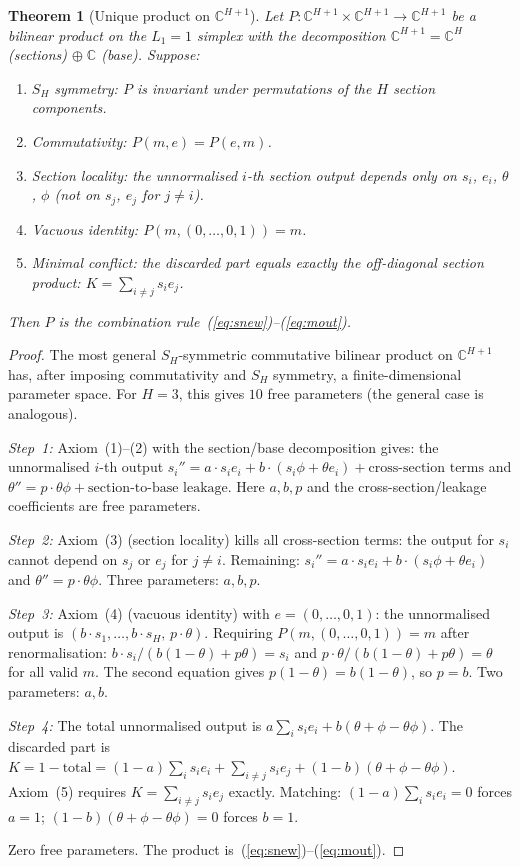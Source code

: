 \documentclass[11pt,a4paper]{article}
\newtheorem{theorem}{Theorem}[section]
\theoremstyle{definition}
\theoremstyle{remark}
\newcommand{\C}{\mathbb{C}}
\begin{document}
\begin{theorem}[Unique product on $\C^{H+1}$]\label{thm:unique_product}
Let $P:\C^{H+1}\times\C^{H+1}\to\C^{H+1}$ be a bilinear product on the $L_1=1$ simplex with the decomposition $\C^{H+1}=\C^H$ (sections) $\oplus\;\C$ (base). Suppose:
\begin{enumerate}[nosep]
\item \emph{$S_H$ symmetry:} $P$ is invariant under permutations of the $H$ section components.
\item \emph{Commutativity:} $P(m,e)=P(e,m)$.
\item \emph{Section locality:} the unnormalised $i$-th section output depends only on $s_i$, $e_i$, $\theta$, $\phi$ (not on $s_j$, $e_j$ for $j\neq i$).
\item \emph{Vacuous identity:} $P(m,(0,\ldots,0,1))=m$.
\item \emph{Minimal conflict:} the discarded part equals exactly the off-diagonal section product: $K=\sum_{i\neq j}s_ie_j$.
\end{enumerate}
Then $P$ is the combination rule~(\ref{eq:snew})--(\ref{eq:mout}).
\end{theorem}

\begin{proof}
The most general $S_H$-symmetric commutative bilinear product on $\C^{H+1}$ has, after imposing commutativity and $S_H$ symmetry, a finite-dimensional parameter space. For $H=3$, this gives $10$ free parameters (the general case is analogous).

\emph{Step~1:} Axiom~(1)--(2) with the section/base decomposition gives: the unnormalised $i$-th output $s_i''=a\cdot s_ie_i+b\cdot(s_i\phi+\theta e_i)+\text{cross-section terms}$ and $\theta''=p\cdot\theta\phi+\text{section-to-base leakage}$. Here $a,b,p$ and the cross-section/leakage coefficients are free parameters.

\emph{Step~2:} Axiom~(3) (section locality) kills all cross-section terms: the output for $s_i$ cannot depend on $s_j$ or $e_j$ for $j\neq i$. Remaining: $s_i''=a\cdot s_ie_i+b\cdot(s_i\phi+\theta e_i)$ and $\theta''=p\cdot\theta\phi$. Three parameters: $a,b,p$.

\emph{Step~3:} Axiom~(4) (vacuous identity) with $e=(0,\ldots,0,1)$: the unnormalised output is $(b\cdot s_1,\ldots,b\cdot s_H,\,p\cdot\theta)$. Requiring $P(m,(0,\ldots,0,1))=m$ after renormalisation: $b\cdot s_i/(b(1-\theta)+p\theta)=s_i$ and $p\cdot\theta/(b(1-\theta)+p\theta)=\theta$ for all valid $m$. The second equation gives $p(1-\theta)=b(1-\theta)$, so $p=b$. Two parameters: $a,b$.

\emph{Step~4:} The total unnormalised output is $a\sum_i s_ie_i+b(\theta+\phi-\theta\phi)$. The discarded part is $K=1-\text{total}=(1-a)\sum_i s_ie_i+\sum_{i\neq j}s_ie_j+(1-b)(\theta+\phi-\theta\phi)$. Axiom~(5) requires $K=\sum_{i\neq j}s_ie_j$ exactly. Matching: $(1-a)\sum_i s_ie_i=0$ forces $a=1$; $(1-b)(\theta+\phi-\theta\phi)=0$ forces $b=1$.

Zero free parameters. The product is~(\ref{eq:snew})--(\ref{eq:mout}).
\end{proof}
\end{document}
